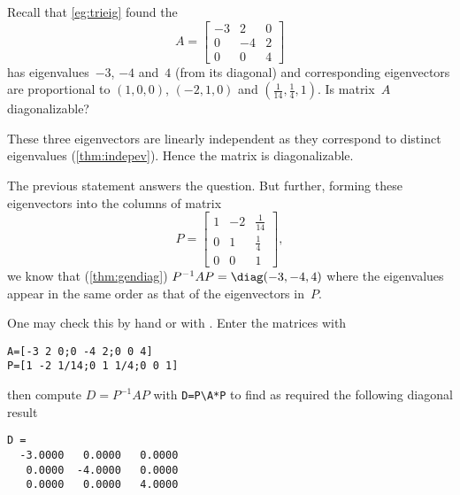\begin{example} \label{eg:trieigp}
Recall that \autoref{eg:trieig} found the 
\begin{equation*}
A=\begin{bmatrix}-3&2&0
\\0&-4&2
\\0&0&4\end{bmatrix}
\end{equation*}
has eigenvalues~\(-3\), \(-4\) and~\(4\) (from its diagonal) and corresponding eigenvectors are proportional to \((1,0,0)\), \((-2,1,0)\) and \((\frac1{14},\frac14,1)\).
Is matrix~\(A\) diagonalizable?
\begin{solution} 
These three eigenvectors are linearly independent as they correspond to distinct eigenvalues (\autoref{thm:indepev}).
Hence the matrix is diagonalizable.

The previous statement answers the question. 
But further, forming these eigenvectors into the columns of matrix
\begin{equation*}
P=\begin{bmatrix} 1&-2&\frac1{14}
\\0&1&\frac14
\\0&0&1 \end{bmatrix},
\end{equation*}
we know that (\autoref{thm:gendiag}) \(P^{-1}AP=\diag(-3,-4,4)\) where the eigenvalues appear in the same order as that of the eigenvectors in~\(P\).

One may check this by hand or with \script.
Enter the matrices with
\begin{verbatim}
A=[-3 2 0;0 -4 2;0 0 4]
P=[1 -2 1/14;0 1 1/4;0 0 1]
\end{verbatim}
\setbox\ajrqrbox\hbox{}\marginajrbox%
then compute \(D=P^{-1}AP\) with \verb|D=P\A*P| to find as required the following diagonal result
\begin{verbatim}
D =
  -3.0000   0.0000   0.0000
   0.0000  -4.0000   0.0000
   0.0000   0.0000   4.0000
\end{verbatim}
\end{solution}
\end{example}



